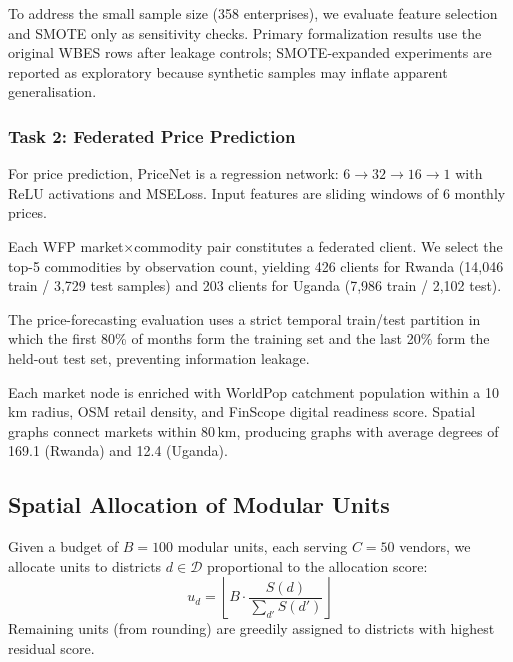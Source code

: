 \documentclass{article}
\begin{document}
To address the small sample size (358 enterprises), we evaluate feature selection and SMOTE \cite{chawla2002smote} only as sensitivity checks.
Primary formalization results use the original WBES rows after leakage controls; SMOTE-expanded experiments are reported as exploratory because synthetic samples may inflate apparent generalisation.

\subsubsection{Task 2: Federated Price Prediction}

For price prediction, PriceNet is a regression network: $6 \to 32 \to 16 \to 1$ with ReLU activations and MSELoss.
Input features are sliding windows of 6 monthly prices.

Each WFP market$\times$commodity pair constitutes a federated client.
We select the top-5 commodities by observation count, yielding 426 clients for Rwanda (14,046 train / 3,729 test samples) and 203 clients for Uganda (7,986 train / 2,102 test).

The price-forecasting evaluation uses a strict temporal train/test partition in which the first 80\% of months form the training set and the last 20\% form the held-out test set, preventing information leakage.

Each market node is enriched with WorldPop catchment population within a 10\,km radius, OSM retail density, and FinScope digital readiness score.
Spatial graphs connect markets within 80\,km, producing graphs with average degrees of 169.1 (Rwanda) and 12.4 (Uganda).

\subsection{Spatial Allocation of Modular Units}

Given a budget of $B{=}100$ modular units, each serving $C{=}50$ vendors, we allocate units to districts $d \in \mathcal{D}$ proportional to the allocation score:
\begin{equation}
    u_d = \left\lfloor B \cdot \frac{S(d)}{\textstyle\sum_{d'} S(d')} \right\rfloor
    \label{eq:allocation}
\end{equation}
Remaining units (from rounding) are greedily assigned to districts with highest residual score.
\end{document}
